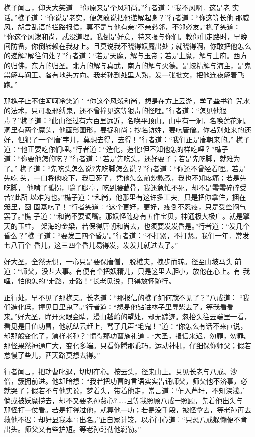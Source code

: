 樵子闻言，仰天大笑道：“你原来是个风和尚。”行者道：“我不风啊，这是老
实话。”樵子道：“你说是老实，便怎敢说把他递解起身？”行者道：“你这等长他
那威风，胡言乱语的拦路报信，莫不是与他有亲?不亲必邻，不邻必友。”樵子笑道：
“你这个风泼和尚，忒没道理。我倒是好意，特来报与你们。教你们走路时，早晚
间防备，你倒转赖在我身上。且莫说我不晓得妖魔出处；就晓得啊，你敢把他怎么
的递解?解往何处？”行者道：“若是天魔，解与玉帝；若是土魔，解与土府。西方
的归佛，东方的归圣。北方的解与真武，南方的解与火德。是蛟精解与海主，是鬼
祟解与阎王。各有地头方向。我老孙到处里人熟，发一张批文，把他连夜解着飞跑。”

那樵子止不住呵呵冷笑道：“你这个风泼和尚，想是在方上云游，学了些书符
咒水的法术，只可驱邪缚鬼，还不曾撞见这等狠毒的怪哩。”行者道：“怎见他狠
毒？”樵子道：“此山径过有六百里远近，名唤平顶山。山中有一洞，名唤莲花洞。
洞里有两个魔头，他画影图形，要捉和尚；抄名访姓，要吃唐僧。你若别处来的还
好，但犯了一个‘唐’字儿，莫想去得，去得！”行者道：“我们正是唐朝来的。”
樵子道：“他正要吃你们哩。”行者道：“造化，造化!但不知他怎的样吃哩？”樵子
道：“你要他怎的吃？”行者道：“若是先吃头，还好耍子；若是先吃脚，就难为了。”
樵子道：“先吃头怎么说?先吃脚怎么说？”行者道：“你还不曾经着哩。若是先吃
头，一口将他咬下，我已死了，凭他怎么煎炒熬煮，我也不知疼痛；若是先吃脚，
他啃了孤拐，嚼了腿亭，吃到腰截骨，我还急忙不死，却不是零零碎碎受苦?此所
以难为也。”樵子道：“和尚，他那里有这许多工夫，只是把你拿住，捆在笼里，囫
囵蒸吃了！”行者笑道：“这个更好，更好，疼倒不忍疼，只是受些闷气罢了。”樵
子道：“和尚不要调嘴。那妖怪随身有五件宝贝，神通极大极广。就是擎天的玉柱，
架海的金梁，若保得唐朝和尚去，也须要发发昏是。”行者道：“发几个昏么？”樵
子道：“要发三四个昏是。”行者道：“不打紧，不打紧。我们一年，常发七八百个
昏儿，这三四个昏儿易得发，发发儿就过去了。”

好大圣，全然无惧，一心只是要保唐僧，脱樵夫，拽步而转。径至山坡马头
前道：“师父，没甚大事。有便有个把妖精儿，只是这里人胆小，放他在心上。有
我哩，怕他怎的?走路，走路！”长老见说，只得放怀随行。

正行处，早不见了那樵夫。长老道：“那报信的樵子如何就不见了？”八戒道：
“我们造化低，撞见日里鬼了。”行者道：“想是他钻进林子里寻柴去了。等我看看
来。”好大圣，睁开火眼金睛，漫山越岭的望处，却无踪迹。忽抬头往云端里一看，
看见是日值功曹，他就纵云赶上，骂了几声“毛鬼！”道：“你怎么有话不来直说，
却那般变化了，演样老孙？”慌得那功曹施礼道：“大圣，报信来迟，勿罪，勿罪。
那怪果然神通广大，变化多端。只看你腾那乖巧，运动神机，仔细保你师父；假若
怠慢了些儿，西天路莫想去得。”

行者闻言，把功曹叱退，切切在心。按云头，径来山上。只见长老与八戒、沙
僧，簇拥前进。他却暗想：“我若把功曹的言语实实告诵师父，师父他不济事，必
就哭了；假若不与他实说，梦着头，带着他走，常言道：‘乍入芦圩，不知深浅。’
倘或被妖魔捞去，却不又要老孙费心?……且等我照顾八戒一照顾，先着他出头与
那怪打一仗看。若是打得过他，就算他一功；若是没手段，被怪拿去，等老孙再去
救他不迟：却好显我本事出名。”正自家计较，以心问心道：“只恐八戒躲懒便不肯
出头。师父又有些护短。等老孙羁勒他羁勒。”

